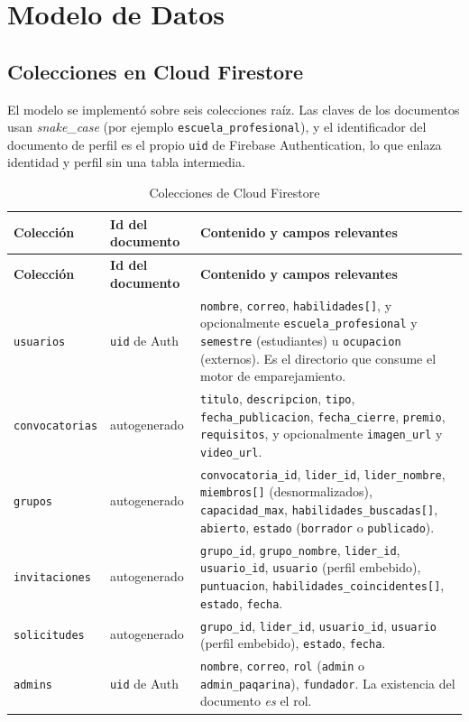 \documentclass[12pt,a4paper]{article}
\begin{document}
\newpage
\section{Modelo de Datos}

\subsection{Colecciones en Cloud Firestore}
El modelo se implementó sobre seis colecciones raíz. Las claves de los documentos usan \emph{snake\_case} (por ejemplo \texttt{escuela\_profesional}), y el identificador del documento de perfil es el propio \texttt{uid} de Firebase Authentication, lo que enlaza identidad y perfil sin una tabla intermedia.

\begin{longtable}{L{2.8cm}L{3.0cm}L{8.0cm}}
\caption{Colecciones de Cloud Firestore}\label{tab:colecciones}\\
\toprule
\textbf{Colección} & \textbf{Id del documento} & \textbf{Contenido y campos relevantes} \\
\midrule
\endfirsthead
\toprule
\textbf{Colección} & \textbf{Id del documento} & \textbf{Contenido y campos relevantes} \\
\midrule
\endhead
\bottomrule
\endfoot
\texttt{usuarios} & \texttt{uid} de Auth & \texttt{nombre}, \texttt{correo}, \texttt{habilidades[]}, y opcionalmente \texttt{escuela\_profesional} y \texttt{semestre} (estudiantes) u \texttt{ocupacion} (externos). Es el directorio que consume el motor de emparejamiento. \\
\texttt{convocatorias} & autogenerado & \texttt{titulo}, \texttt{descripcion}, \texttt{tipo}, \texttt{fecha\_publicacion}, \texttt{fecha\_cierre}, \texttt{premio}, \texttt{requisitos}, y opcionalmente \texttt{imagen\_url} y \texttt{video\_url}. \\
\texttt{grupos} & autogenerado & \texttt{convocatoria\_id}, \texttt{lider\_id}, \texttt{lider\_nombre}, \texttt{miembros[]} (desnormalizados), \texttt{capacidad\_max}, \texttt{habilidades\_buscadas[]}, \texttt{abierto}, \texttt{estado} (\texttt{borrador} o \texttt{publicado}). \\
\texttt{invitaciones} & autogenerado & \texttt{grupo\_id}, \texttt{grupo\_nombre}, \texttt{lider\_id}, \texttt{usuario\_id}, \texttt{usuario} (perfil embebido), \texttt{puntuacion}, \texttt{habilidades\_coincidentes[]}, \texttt{estado}, \texttt{fecha}. \\
\texttt{solicitudes} & autogenerado & \texttt{grupo\_id}, \texttt{lider\_id}, \texttt{usuario\_id}, \texttt{usuario} (perfil embebido), \texttt{estado}, \texttt{fecha}. \\
\texttt{admins} & \texttt{uid} de Auth & \texttt{nombre}, \texttt{correo}, \texttt{rol} (\texttt{admin} o \texttt{admin\_paqarina}), \texttt{fundador}. La existencia del documento \emph{es} el rol. \\
\end{longtable}
\end{document}
